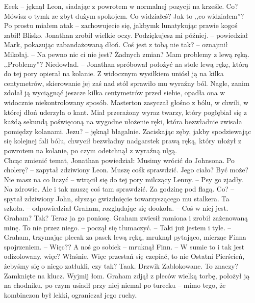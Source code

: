 \documentclass[../MAIN.tex]{subfiles}
\begin{document}
\xx Eee\3k -- jęknął Leon, siadając z powrotem w normalnej pozycji na krześle.
\xx Co?
\xx Mówisz o tym\3k ze zbyt dużym spokojem. Co widziałeś?
\xx Jak to ,,co widziałem''? Po prostu miałem atak -- zachowujecie się, jakbym\3k lunatykując prawie kogoś zabił!
\xx Blisko.
\qd
Jonathan zrobił wielkie oczy.
\sx Podziękujesz mi później. -- powiedział Mark, pokazując zabandażowaną dłoń.
\xx Coś jest z tobą nie tak? -- oznajmił Mikołaj. -- Na pewno nic ci nie jest? Żadnych zmian?
\xx Mam problemy z lewą ręką.
\xx ,,Problemy''?
\xx Niedowład. -- Jonathan spróbował położyć na stole lewą rękę, którą do tej pory opierał na kolanie.
\qd
Z widocznym wysiłkiem uniósł ją na kilka centymetrów, skierowanie jej zaś nad stół sprawiło mu wyraźny ból. Nagle, zanim zdołał ją wyciągnąć jeszcze kilka centymetrów przed siebie, opadła ona w widocznie niekontrolowany sposób.
Masterton zasyczał głośno z bólu, w chwili, w której dłoń uderzyła o kant. Miał przerażony wyraz twarzy, który pogłębiał się z każdą sekundą poświęconą na wygodne ułożenie ręki, która bezwładnie zwisała pomiędzy kolanami.
\sx Jezu? -- jęknął błagalnie.
\qd
Zaciskając zęby, jakby spodziewając się kolejnej fali bólu, chwycił bezwładny nadgarstek prawą ręką, który ułożył z powrotem na kolanie, po czym odetchnął z wyraźną ulgą.\\
Chcąc zmienić temat, Jonathan powiedział:
\sx Musimy wrócić do Johnsona.
\xx Po cholerę? -- zapytał zdziwiony Leon.
\xx Muszę coś\3k sprawdzić.
\xx Jego ciało?
\xx Być może?
\xx Nie masz na co liczyć -- wtrącił się do tej pory milczący Lenny. -- Psy go zjadły.
\xx Na zdrowie. Ale i tak muszę coś tam sprawdzić. Za godzinę pod flagą.
\dd
\xx Co? -- spytał zdziwiony John, słysząc gwizdnięcie towarzyszącego mu stalkera.
\xx Ta szkoła. -- odpowiedział Graham, rozglądając się dookoła. -- Coś w niej jest.
\xx Graham?
\xx Tak?
\xx Teraz ja go poniosę.
\qd
Graham zwiesił ramiona i zrobił zażenowaną minę.
\sx To nie przez niego. -- począł się tłumaczyć. -- Taki już jestem i tyle. -- Graham, trzymając plecak za pasek lewą ręką, mruknął pytająco, mierząc Finna spojrzeniem. -- Więc??
\xx A noś go sobie\3k -- mruknął Finn. -- W sumie to i tak jest odizolowany, więc?
\xx Właśnie. Więc przestań się czepiać, to nie Ostatni Pierścień, żebyśmy się o niego zatłukli, czy tak?
\xx Taak.
\xx Drzwi\3k
\xx Zablokowane.
\xx To znaczy?
\xx Zamknięte na klucz. Wyjmij łom.
\qd
Graham zdjął z pleców wielką torbę, położył ją na chodniku, po czym usiadł przy niej niemal po turecku -- mimo tego, że kombinezon był lekki, ograniczał jego ruchy.\\
\end{document}
